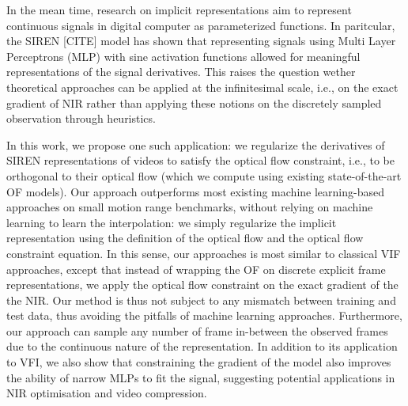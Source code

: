 \documentclass{article}
\begin{document}
In the mean time, research on implicit representations aim to represent continuous signals in digital computer as parameterized functions. 
In paritcular, the SIREN [CITE] model has shown that representing signals using Multi Layer Perceptrons (MLP) with sine activation functions
allowed for meaningful representations of the signal derivatives.
This raises the question wether theoretical approaches can be applied at the infinitesimal scale, i.e., on the exact gradient
of NIR rather than applying these notions on the discretely sampled observation through heuristics.

In this work, we propose one such application:
we regularize the derivatives of SIREN representations of videos to satisfy the optical flow constraint, i.e., to be orthogonal to their optical flow 
(which we compute using existing state-of-the-art OF models).
Our approach outperforms most existing machine learning-based approaches on small motion range benchmarks,
without relying on machine learning to learn the interpolation:
we simply regularize the implicit representation using the definition
of the optical flow and the optical flow constraint equation.
In this sense, our approaches is most similar to classical VIF approaches,
except that instead of wrapping the OF on discrete explicit frame representations,
we apply the optical flow constraint on the exact gradient of the the NIR.
Our method is thus not subject to any mismatch between training and test data,
thus avoiding the pitfalls of machine learning approaches.
Furthermore, our approach can sample any number of frame in-between the observed frames due to the continuous nature of the representation.
In addition to its application to VFI, we also show that constraining the gradient of the model also improves the ability of narrow MLPs to fit the signal,
suggesting potential applications in NIR optimisation and video compression.
\end{document}
